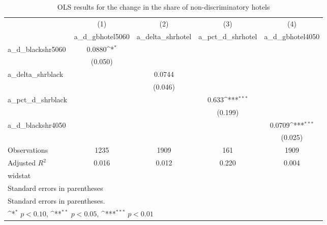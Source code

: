 \begin{table}[htbp]\centering
\def\sym#1{\ifmmode^{#1}\else\(^{#1}\)\fi}
\caption{OLS results for the change in the share of non-discriminatory hotels}
\begin{tabular}{l*{4}{c}}
\hline\hline
                    &\multicolumn{1}{c}{(1)}&\multicolumn{1}{c}{(2)}&\multicolumn{1}{c}{(3)}&\multicolumn{1}{c}{(4)}\\
                    &\multicolumn{1}{c}{a\_d\_gbhotel5060}&\multicolumn{1}{c}{a\_delta\_shrhotel}&\multicolumn{1}{c}{a\_pct\_d\_shrhotel}&\multicolumn{1}{c}{a\_d\_gbhotel4050}\\
\hline
a\_d\_blackshr5060    &      0.0880\sym{*}  &                     &                     &                     \\
                    &     (0.050)         &                     &                     &                     \\
[1em]
a\_delta\_shrblack    &                     &      0.0744         &                     &                     \\
                    &                     &     (0.046)         &                     &                     \\
[1em]
a\_pct\_d\_shrblack    &                     &                     &       0.633\sym{***}&                     \\
                    &                     &                     &     (0.199)         &                     \\
[1em]
a\_d\_blackshr4050    &                     &                     &                     &      0.0709\sym{***}\\
                    &                     &                     &                     &     (0.025)         \\
\hline
Observations        &        1235         &        1909         &         161         &        1909         \\
Adjusted \(R^{2}\)  &       0.016         &       0.012         &       0.220         &       0.004         \\
widstat             &                     &                     &                     &                     \\
\hline\hline
\multicolumn{5}{l}{\footnotesize Standard errors in parentheses}\\
\multicolumn{5}{l}{\footnotesize Standard errors in parentheses.}\\
\multicolumn{5}{l}{\footnotesize \sym{*} \(p<0.10\), \sym{**} \(p<0.05\), \sym{***} \(p<0.01\)}\\
\end{tabular}
\end{table}
